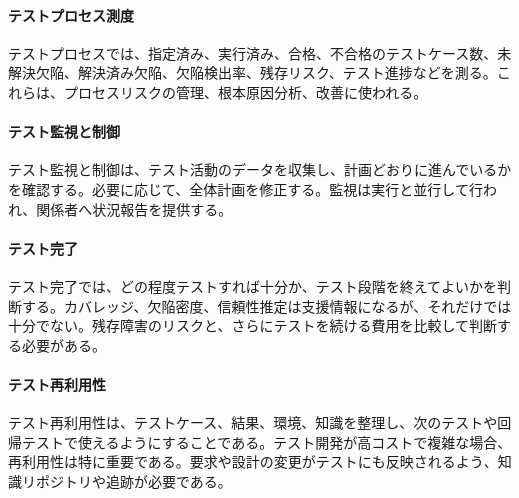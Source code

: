 \paragraph{テストプロセス測度}
テストプロセスでは、指定済み、実行済み、合格、不合格のテストケース数、未解決欠陥、解決済み欠陥、欠陥検出率、残存リスク、テスト進捗などを測る。これらは、プロセスリスクの管理、根本原因分析、改善に使われる。

\paragraph{テスト監視と制御}
テスト監視と制御は、テスト活動のデータを収集し、計画どおりに進んでいるかを確認する。必要に応じて、全体計画を修正する。監視は実行と並行して行われ、関係者へ状況報告を提供する。

\paragraph{テスト完了}
テスト完了では、どの程度テストすれば十分か、テスト段階を終えてよいかを判断する。カバレッジ、欠陥密度、信頼性推定は支援情報になるが、それだけでは十分でない。残存障害のリスクと、さらにテストを続ける費用を比較して判断する必要がある。

\paragraph{テスト再利用性}
テスト再利用性は、テストケース、結果、環境、知識を整理し、次のテストや回帰テストで使えるようにすることである。テスト開発が高コストで複雑な場合、再利用性は特に重要である。要求や設計の変更がテストにも反映されるよう、知識リポジトリや追跡が必要である。
